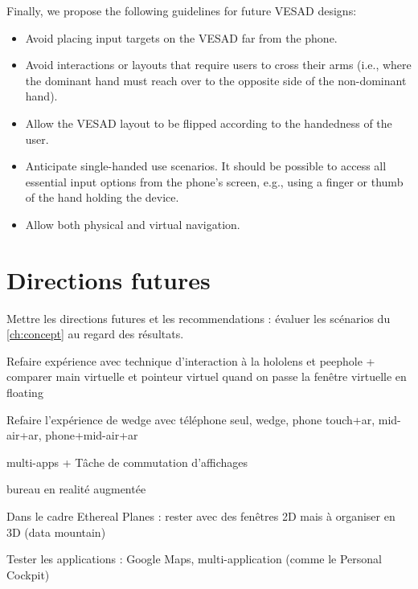 Finally, we propose the following guidelines for future VESAD designs:

\begin{itemize}
  \item Avoid placing input targets on the VESAD far from the phone.
  \item Avoid interactions or layouts that require users to cross their arms (i.e., where the dominant hand must reach over to the opposite side of the non-dominant hand).
  \item Allow the VESAD layout to be flipped according to the handedness of the user.
  \item Anticipate single-handed use scenarios. It should be possible to access all essential input options from the phone's screen, e.g., using a finger or thumb of the hand holding the device.
  \item Allow both physical and virtual navigation.
\end{itemize}



\section{Directions futures}
\label{sec:future_work}

Mettre les directions futures et les recommendations : évaluer les scénarios du \autoref{ch:concept} au regard des résultats.

Refaire expérience avec technique d'interaction à la hololens et peephole + comparer main virtuelle et pointeur virtuel quand on passe la fenêtre virtuelle en floating

Refaire l'expérience de wedge avec téléphone seul, wedge, phone touch+ar, mid-air+ar, phone+mid-air+ar

multi-apps + Tâche de commutation d'affichages

bureau en realité augmentée

Dans le cadre Ethereal Planes : rester avec des fenêtres 2D mais à organiser en 3D (data mountain)

Tester les applications : Google Maps, multi-application (comme le Personal Cockpit)

